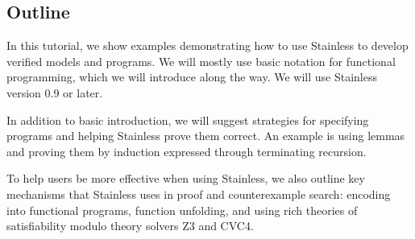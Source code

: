 \subsection{Outline}
  
In this tutorial, we show examples
demonstrating how to use Stainless to develop verified
models and programs. We will mostly use basic notation
for functional programming, which we will introduce along the way.
We will use Stainless version 0.9 or later.

In addition to basic introduction, we will suggest
strategies for specifying programs and helping Stainless
prove them correct. An example is using lemmas and proving
them by induction expressed through terminating recursion.

To help users be more effective when using Stainless, we
also outline key mechanisms that Stainless uses
in proof and counterexample search: encoding into
functional programs, function unfolding, and using rich
theories of satisfiability modulo theory solvers Z3 and
CVC4.
